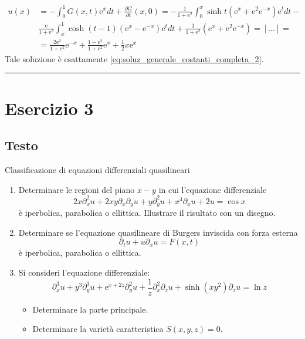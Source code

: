 \documentclass[]{scrartcl}
\newcommand{\qedsymbol}{\hfill \rule{0.7em}{0.7em}}
\newcommand{\px}{\partial_x}
\newcommand{\pt}{\partial_t}
\newcommand{\pxy}{\partial_x\partial_y}
\newcommand{\pdx}[1]{\partial^#1_x}
\newcommand{\pdy}[1]{\partial^#1_y}
\newcommand{\xt}{(x,t)}
\begin{document}
\begin{equation} 
\begin{split}
u(x) & = -\int_0^1 G(x,t) \mathrm{e}^x dt + \frac{\partial G}{\partial t}(x,0) = -\frac{1}{1+\mathrm{e}^2}\int_0^x\sinh t(\mathrm{e}^x + \mathrm{e}^2\mathrm{e}^{-x})\mathrm{e}^t dt - \\ & \frac{\mathrm{e}}{1+\mathrm{e}^2}\int_x^1\cosh(t-1)(\mathrm{e}^x - \mathrm{e}^{-x})\mathrm{e}^t dt +  \frac{1}{1+\mathrm{e^2}} \left( \mathrm{e}^x + \mathrm{e}^2\mathrm{e}^{-x}\right) =  [\dots] =  \\ & = \frac{2\mathrm{e}^2}{1+\mathrm{e}^2}  \mathrm{e}^{-x} +  \frac{1-\mathrm{e}^2}{1+\mathrm{e}^2}\mathrm{e}^x + \frac{1}{2}x\mathrm{e}^x
\end{split}	
\end{equation}
Tale soluzione è esattamente \eqref{eq:soluz_generale_costanti_completa_2}.
\qedsymbol
\section*{Esercizio 3}

\subsection*{Testo} Classificazione di equazioni differenziali quasilineari

\begin{enumerate}
	\item Determinare le regioni del piano $ x-y $ in cui l'equazione differenziale
	\begin{equation}
	2x\pdx{2}u + 2xy\pxy u + y \pdy{2}u + x^4\px u + 2u = \cos x
	\label{eq:2xuxx}
	\end{equation}
	è iperbolica, parabolica o ellittica. Illustrare il risultato con un disegno.
	\item Determinare se l'equazione quasilineare di Burgers inviscida con forza esterna 
	\begin{equation}
	\pt u + u \px u = F\xt
	\label{eq:burgers}
	\end{equation}
	è iperbolica, parabolica o ellittica.
	\item Si consideri l'equazione differenziale:
	\begin{equation}
	\pdx{3}u+y^3\pdy{3}u+\mathrm{e}^{x+2z}\pdy{2}u + \frac{1}{z} \pdx{2} \partial_z u + \sinh(xy^2)\partial_z u= \ln z
	\label{eq:bestia}
	\end{equation}
	\begin{itemize}
		\item Determinare la parte principale.
		\item Determinare la varietà caratteristica $ S(x,y,z) = 0 $.
	\end{itemize}
\end{enumerate}
\end{document}

